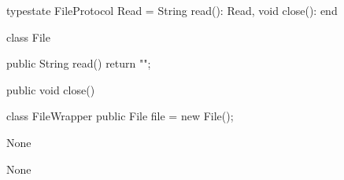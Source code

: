 \begin{code}
typestate FileProtocol {
  Read = {
    String read(): Read,
    void close(): end
  }
}\end{code}

\begin{code}
class File {

  public String read() {
    return "";
  }

  public void close() {
  }

}\end{code}

\begin{code}
class FileWrapper {
  public File file = new File();
}\end{code}

\lstset{language=,caption=Original Mungo output}
\begin{code}
None
\end{code}

\lstset{language=,caption=New Mungo output}
\begin{code}
None
\end{code}

